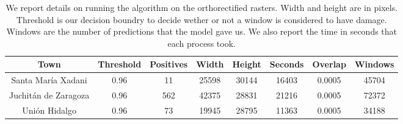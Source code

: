 \begin{table}[h!]
  \centering
  \begin{tabular}{|c|c|c|c|c|c|c|c|}
    \hline
    Town                 &Threshold&Positives  & Width & Height & Seconds & Overlap &Windows \\ \hline
    Santa Mar\'ia Xadani   &0.96      &11         & 25598 & 30144  & 16403   & 0.0005  &45704 \\ \hline
    Juchit\'an de Zaragoza &0.96      &562        & 42375 & 28831  & 21216   & 0.0005  &72372 \\ \hline
    Uni\'on Hidalgo        &0.96      &73         & 19945 & 28795  & 11363   & 0.0005  &34188 \\
    \hline
  \end{tabular}
  \caption{We report details on running the algorithm on the orthorectified rasters. Width and height are in pixels. Threshold is our decision boundry to decide wether or not a window is considered to have damage. Windows are the number of predictions that the model gave us. We also report the time in seconds that each process took.}
  \label{table:results}
\end{table}


